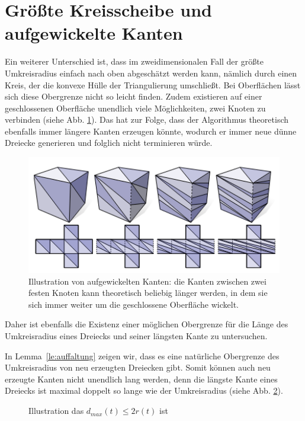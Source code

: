 \section*{Größte Kreisscheibe und aufgewickelte Kanten}
Ein weiterer Unterschied ist, dass im zweidimensionalen Fall der größte Umkreisradius  einfach nach oben abgeschätzt werden kann, nämlich durch einen Kreis, der die konvexe Hülle der Triangulierung umschließt. Bei Oberflächen lässt sich diese Obergrenze nicht so leicht finden. Zudem existieren auf einer geschlossenen Oberfläche unendlich viele Möglichkeiten, zwei Knoten zu verbinden (siehe Abb. \ref{fig:aufgewickeltung}). Das hat zur Folge, dass der Algorithmus theoretisch ebenfalls immer längere Kanten erzeugen könnte, wodurch er immer neue dünne Dreiecke generieren und folglich nicht terminieren würde.\\
 \begin{figure}[H]
    \centering
    \includegraphics[width=5in]{images/aufgewickeltes_dreieck.png}
    \caption{ Illustration von aufgewickelten Kanten: die Kanten zwischen zwei festen Knoten kann theoretisch beliebig länger werden, in dem sie sich immer weiter um die geschlossene Oberfläche wickelt.\cite{Sharp:2019:NIT} }
    \label{fig:aufgewickeltung}
\end{figure}


Daher ist ebenfalls die Existenz einer möglichen Obergrenze für die Länge des Umkreisradius eines Dreiecks und seiner längsten Kante zu untersuchen. 

In Lemma~\ref{le:auffaltung} zeigen wir, dass es eine natürliche Obergrenze des Umkreisradius von neu erzeugten Dreiecken gibt. Somit können auch neu erzeugte Kanten nicht unendlich lang werden, denn die längste Kante eines Dreiecks ist maximal doppelt so lange wie der Umkreisradius (siehe Abb. \ref{fig:langsteKante}).
 \begin{figure}[H]
    \centering
    
    \caption{ Illustration das $d_{max}(t) \leq 2r(t)$ ist}%
    \label{fig:langsteKante}
\end{figure}
 


